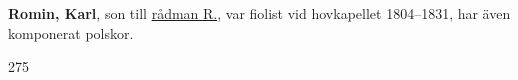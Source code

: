 \textbf{Romin, Karl}, son till \href{Romin-J}{rådman R.}, var fiolist vid hovkapellet 1804--1831, har även komponerat polskor. 

275 
